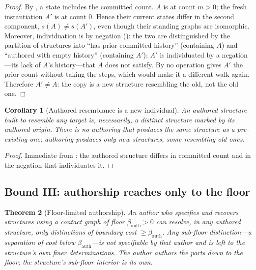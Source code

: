 \documentclass[11pt,a4paper]{article}
\theoremstyle{thmstyle}
\newtheorem{theorem}{Theorem}[section]
\newtheorem{corollary}[theorem]{Corollary}
\theoremstyle{definition}
\theoremstyle{remark}
\newcommand{\floorc}{\beta}               %
\newcommand{\Agent}{A}                    %
\begin{document}
\begin{proof}
By , a state includes the committed count. $\Agent$ is at count
$m>0$; the fresh instantiation $\Agent'$ is at count $0$. Hence their current
states differ in the second component, $s(\Agent)\neq s(\Agent')$, even though
their standing graphs are isomorphic. Moreover, individuation is by negation
(): the two are distinguished by the partition of structures
into ``has prior committed history'' (containing $\Agent$) and ``authored with
empty history'' (containing $\Agent'$); $\Agent'$ is individuated by a
negation---its lack of $\Agent$'s history---that $\Agent$ does not satisfy. By
 no operation gives $\Agent'$ the prior count without taking
the steps, which would make it a different walk again. Therefore $\Agent'\neq
\Agent$: the copy is a new structure resembling the old, not the old one.
\end{proof}

\begin{corollary}[Authored resemblance is a new individual]
\label{cor:new-individual}
An authored structure built to resemble any target is, necessarily, a distinct
structure marked by its authored origin. There is no authoring that produces
\emph{the same} structure as a pre-existing one; authoring produces only new
structures, some resembling old ones.
\end{corollary}

\begin{proof}
Immediate from : the authored structure differs in committed
count and in the negation that individuates it.
\end{proof}

\subsection{Bound III: authorship reaches only to the floor}

\begin{theorem}[Floor-limited authorship]
\label{thm:floor-limited}
An author who specifies and recovers structures using a contact graph of floor
$\floorc_{\mathrm{auth}}>0$ can resolve, in any authored structure, only
distinctions of boundary cost $\ge\floorc_{\mathrm{auth}}$. Any sub-floor
distinction---a separation of cost below $\floorc_{\mathrm{auth}}$---is not
specifiable by that author and is left to the structure's own finer
determinations. The author authors the parts down to the floor; the structure's
sub-floor interior is its own.
\end{theorem}
\end{document}
